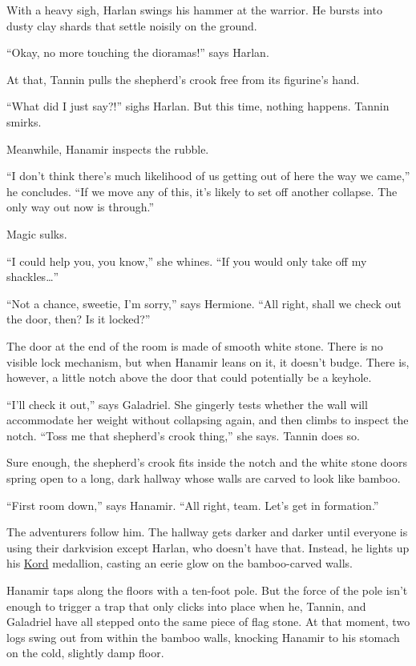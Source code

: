 \documentclass[smalldemyvopaper,11pt,twoside,onecolumn,openright,extrafontsizes]{memoir}
\begin{document}
With a heavy sigh, Harlan swings his hammer at the warrior. He bursts
into dusty clay shards that settle noisily on the ground.

``Okay, no more touching the dioramas!'' says Harlan.

At that, Tannin pulls the shepherd's crook free from its figurine's
hand.

``What did I just say?!'' sighs Harlan. But this time, nothing happens.
Tannin smirks.

Meanwhile, Hanamir inspects the rubble.

``I don't think there's much likelihood of us getting out of here the
way we came,'' he concludes. ``If we move any of this, it's likely to
set off another collapse. The only way out now is through.''

Magic sulks.

``I could help you, you know,'' she whines. ``If you would only take off
my shackles\ldots{}''

``Not a chance, sweetie, I'm sorry,'' says Hermione. ``All right, shall
we check out the door, then? Is it locked?''

The door at the end of the room is made of smooth white stone. There is
no visible lock mechanism, but when Hanamir leans on it, it doesn't
budge. There is, however, a little notch above the door that could
potentially be a keyhole.

``I'll check it out,'' says Galadriel. She gingerly tests whether the
wall will accommodate her weight without collapsing again, and then
climbs to inspect the notch. ``Toss me that shepherd's crook thing,''
she says. Tannin does so.

Sure enough, the shepherd's crook fits inside the notch and the white
stone doors spring open to a long, dark hallway whose walls are carved
to look like bamboo.

``First room down,'' says Hanamir. ``All right, team. Let's get in
formation.''

The adventurers follow him. The hallway gets darker and darker until
everyone is using their darkvision except Harlan, who doesn't have that.
Instead, he lights up his \href{/characters/kord/}{Kord} medallion,
casting an eerie glow on the bamboo-carved walls.

Hanamir taps along the floors with a ten-foot pole. But the force of the
pole isn't enough to trigger a trap that only clicks into place when he,
Tannin, and Galadriel have all stepped onto the same piece of flag
stone. At that moment, two logs swing out from within the bamboo walls,
knocking Hanamir to his stomach on the cold, slightly damp floor.
\end{document}
